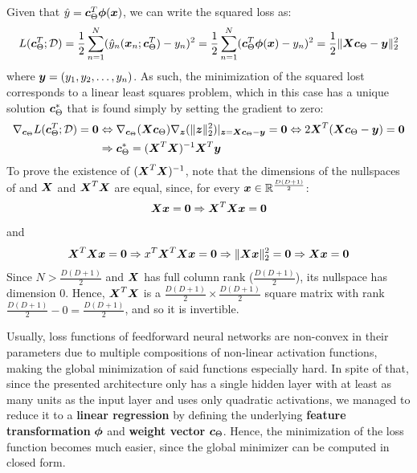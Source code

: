 \documentclass{exam}
\begin{document}
\begin{questions}
        \question
        Given that $\hat{y} = \vb*{c}^T_{\Theta} \vb*{\phi}(\vb*{x})$, we can write the squared loss as:
        \[
            L(\vb*{c}^T_{\Theta}; \mathcal{D}) = \frac{1}{2} \sum_{n = 1}^{N} (\hat{y}_n(\vb*{x}_n; \vb*{c}^T_{\Theta}) - y_n) ^2 = \frac{1}{2} \sum_{n = 1}^{N} (\vb*{c}^T_{\Theta} \vb*{\phi}(\vb*{x}) - y_n) ^2 = \frac{1}{2} \|\vb*{X}\vb*{c}_{\Theta} - \vb*{y} \|_2^2
        \]
        where $\vb*{y} = (y_1, y_2, \dots, y_n)$. As such, the minimization of the squared lost corresponds to a linear least squares problem, which in this case has a unique solution $\vb*{c}^*_{\Theta}$ that is found simply by setting the gradient to zero:
        \begin{align*}
            \nabla_{\vb*{c}_{\Theta}} L(\vb*{c}^T_{\Theta}; \mathcal{D}) = \vb*{0} &\Leftrightarrow \nabla_{\vb*{c}_{\Theta}}(\vb*{X}\vb*{c}_{\Theta}) \nabla_{\vb*{z}}(\|\vb*{z}\|_2^2) \rvert_{\vb*{z} = \vb*{X}\vb*{c}_{\Theta} - \vb*{y}} = \vb*{0} \Leftrightarrow 2\vb*{X}^T(\vb*{X}\vb*{c}_{\Theta} - \vb*{y}) = \vb*{0} \\
            &\Rightarrow \vb*{c}^*_{\Theta} = (\vb*{X}^T\vb*{X})^{-1}\vb*{X}^T\vb*{y}
        \end{align*}
        To prove the existence of $ (\vb*{X}^T\vb*{X})^{-1}$, note that the dimensions of the nullspaces of and $\vb*{X}$ and $\vb*{X}^T\vb*{X}$ are equal, since, for every $\vb*{x} \in \mathbb{R}^{\frac{D(D + 1)}{2}}$:
        \[
            \vb*{X}\vb*{x} = \vb*{0} \Rightarrow \vb*{X}^T\vb*{X}\vb*{x} = \vb*{0}
        \]
        and 
        \[
            \vb*{X}^T\vb*{X}\vb*{x} = \vb*{0} \Rightarrow x^T\vb*{X}^T\vb*{X}\vb*{x} = \vb*{0} 
            \Rightarrow \|\vb*{X}\vb*{x}\|_2^2 = \vb*{0} \Rightarrow \vb*{X}\vb*{x} = \vb*{0}
        \]
        Since $N > \frac{D(D + 1)}{2}$ and $\vb*{X}$ has full column rank ($\frac{D(D + 1)}{2}$), its nullspace has dimension $0$. Hence, $\vb*{X}^T\vb*{X}$ is a $\frac{D(D + 1)}{2} \times \frac{D(D + 1)}{2}$ square matrix with rank $\frac{D(D + 1)}{2} - 0 = \frac{D(D + 1)}{2}$, and so it is invertible. \par
        Usually, loss functions of feedforward neural networks are non-convex in their parameters due to multiple compositions of non-linear activation functions, making the global minimization of said functions especially hard. In spite of that, since the presented architecture only has a single hidden layer with at least as many units as the input layer and uses only quadratic activations, we managed to reduce it to a \textbf{linear regression} by defining the underlying \textbf{feature transformation} $\vb*{\phi}$ and \textbf{weight vector} $\vb*{c}_{\Theta}$. Hence, the minimization of the loss function becomes much easier, since the global minimizer can be computed in closed form.
    \end{questions}
\end{document}
